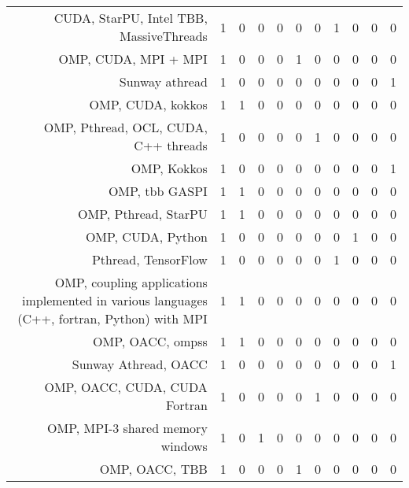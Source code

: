 {\begin{landscape}
\begin{longtable}[htb]{r|c|c|c|c|c|c|c|c|c|c}
{CUDA, StarPU, Intel TBB, MassiveThreads} & 1 & 0 & 0 & 0 & 0 & 0 & 1 & 0 & 0 & 0 \\%
{OMP, CUDA, MPI + MPI} & 1 & 0 & 0 & 0 & 1 & 0 & 0 & 0 & 0 & 0 \\%
{Sunway athread} & 1 & 0 & 0 & 0 & 0 & 0 & 0 & 0 & 0 & 1 \\%
{OMP, CUDA, kokkos} & 1 & 1 & 0 & 0 & 0 & 0 & 0 & 0 & 0 & 0 \\%
{OMP, Pthread, OCL, CUDA, C++ threads} & 1 & 0 & 0 & 0 & 0 & 1 & 0 & 0 & 0 & 0 \\%
{OMP, Kokkos} & 1 & 0 & 0 & 0 & 0 & 0 & 0 & 0 & 0 & 1 \\%
{OMP, tbb GASPI} & 1 & 1 & 0 & 0 & 0 & 0 & 0 & 0 & 0 & 0 \\%
{OMP, Pthread, StarPU} & 1 & 1 & 0 & 0 & 0 & 0 & 0 & 0 & 0 & 0 \\%
{OMP, CUDA, Python} & 1 & 0 & 0 & 0 & 0 & 0 & 0 & 1 & 0 & 0 \\%
{Pthread, TensorFlow} & 1 & 0 & 0 & 0 & 0 & 0 & 1 & 0 & 0 & 0 \\%
{OMP, coupling applications implemented in various languages (C++, fortran, Python) with MPI} & 1 & 1 & 0 & 0 & 0 & 0 & 0 & 0 & 0 & 0 \\%
{OMP, OACC, ompss} & 1 & 1 & 0 & 0 & 0 & 0 & 0 & 0 & 0 & 0 \\%
{Sunway Athread, OACC} & 1 & 0 & 0 & 0 & 0 & 0 & 0 & 0 & 0 & 1 \\%
{OMP, OACC, CUDA, CUDA Fortran} & 1 & 0 & 0 & 0 & 0 & 1 & 0 & 0 & 0 & 0 \\%
{OMP, MPI-3 shared memory windows} & 1 & 0 & 1 & 0 & 0 & 0 & 0 & 0 & 0 & 0 \\%
{OMP, OACC, TBB} & 1 & 0 & 0 & 0 & 1 & 0 & 0 & 0 & 0 & 0 \\%
\hline%
\end{longtable}%
\end{landscape}}%
\clearpage%
